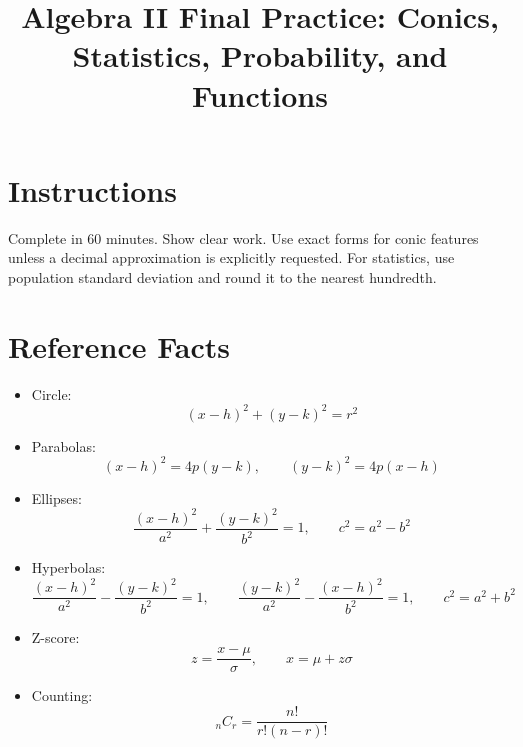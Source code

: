 \documentclass[12pt]{article}
\title{Algebra II Final Practice: Conics, Statistics, Probability, and Functions}
\author{}
\date{}
\begin{document}
\maketitle

\section*{Instructions}
Complete in 60 minutes. Show clear work. Use exact forms for conic features unless a decimal approximation is explicitly requested. For statistics, use population standard deviation and round it to the nearest hundredth.

\section*{Reference Facts}
\begin{itemize}[leftmargin=1.5em]
  \item Circle:
  \[
  (x-h)^2+(y-k)^2=r^2
  \]
  \item Parabolas:
  \[
  (x-h)^2=4p(y-k),\qquad (y-k)^2=4p(x-h)
  \]
  \item Ellipses:
  \[
  \frac{(x-h)^2}{a^2}+\frac{(y-k)^2}{b^2}=1,\qquad c^2=a^2-b^2
  \]
  \item Hyperbolas:
  \[
  \frac{(x-h)^2}{a^2}-\frac{(y-k)^2}{b^2}=1,\qquad
  \frac{(y-k)^2}{a^2}-\frac{(x-h)^2}{b^2}=1,\qquad c^2=a^2+b^2
  \]
  \item Z-score:
  \[
  z=\frac{x-\mu}{\sigma},\qquad x=\mu+z\sigma
  \]
  \item Counting:
  \[
  {}_nC_r=\frac{n!}{r!(n-r)!}
  \]
\end{itemize}
\end{document}
